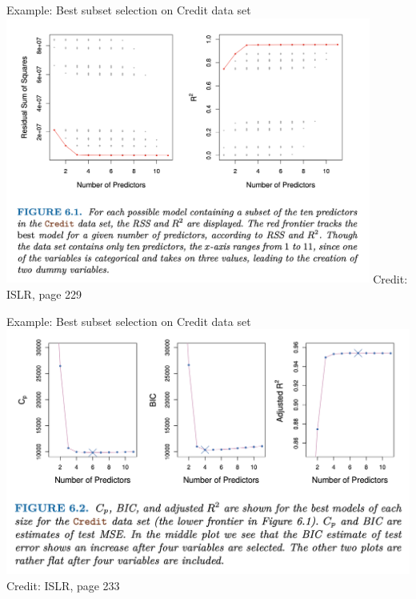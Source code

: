 \documentclass{beamer}
\begin{document}
  \begin{frame}{Example: Best subset selection on Credit data set}
    \centering
    \includegraphics[width = 0.9\textwidth]{images/best_subset_selection.png}
    \vfill
    \hfill \footnotesize Credit: ISLR, page 229
  \end{frame}

  \begin{frame}{Example: Best subset selection on Credit data set}
    \includegraphics[width = \textwidth]{images/subset_selection_validation.png}
    \vfill
    \hfill \footnotesize Credit: ISLR, page 233
  \end{frame}
\end{document}
